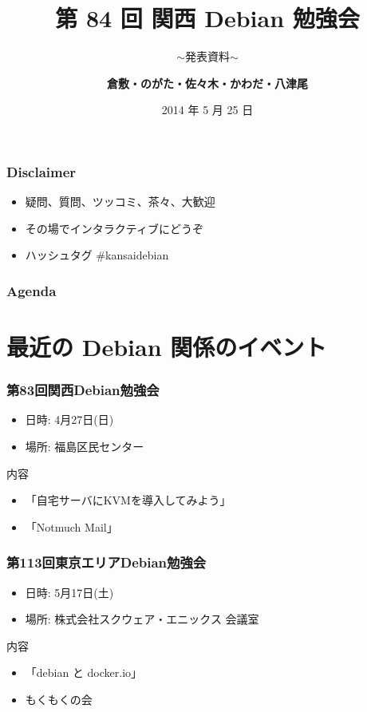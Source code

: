 \documentclass[cjk,dvipdfmx,10pt,compress,%
hyperref={bookmarks=true,bookmarksnumbered=true,bookmarksopen=false,%
colorlinks=false,%
pdftitle={第 84 回 関西 Debian 勉強会},%
pdfauthor={倉敷・のがた・佐々木・かわだ・八津尾},%
pdfsubject={資料},%
}]{beamer}
\title{第 84 回 関西 Debian 勉強会}
\subtitle{$\sim$発表資料$\sim$}
\author[かわだ てつたろう]{{\large\bf 倉敷・のがた・佐々木・かわだ・八津尾}}
\institute[Debian JP]{{\normalsize\tt 関西 Debian 勉強会}}
\date{{\small 2014 年 5 月 25 日}}
\begin{document}
\settitleslide
\begin{frame}
\titlepage
\end{frame}
\setdefaultslide

\begin{frame}[fragile]
  \frametitle{Disclaimer}
  \begin{itemize}
  \item 疑問、質問、ツッコミ、茶々、\alert{大歓迎}
  \item その場でインタラクティブにどうぞ
  \item ハッシュタグ \#kansaidebian
\end{itemize}
\end{frame}

\begin{frame}[fragile]
\frametitle{Agenda}

\tableofcontents

\end{frame}

\section{最近の Debian 関係のイベント}


\begin{frame}[fragile]
  \frametitle{第83回関西Debian勉強会}
  \begin{itemize}
  \item 日時: 4月27日(日)
  \item 場所: 福島区民センター
  \end{itemize}
  \begin{block}{内容}
    \begin{itemize}
    \item 「自宅サーバにKVMを導入してみよう」
    \item 「Notmuch Mail」
    \end{itemize}
  \end{block}
\end{frame}

\begin{frame}[fragile]
  \frametitle{第113回東京エリアDebian勉強会}
  \begin{itemize}
  \item 日時: 5月17日(土)
  \item 場所: 株式会社スクウェア・エニックス 会議室
  \end{itemize}
  \begin{block}{内容}
    \begin{itemize}
    \item 「debian と docker.io」
    \item もくもくの会
    \end{itemize}
  \end{block}
\end{frame}
\end{document}
